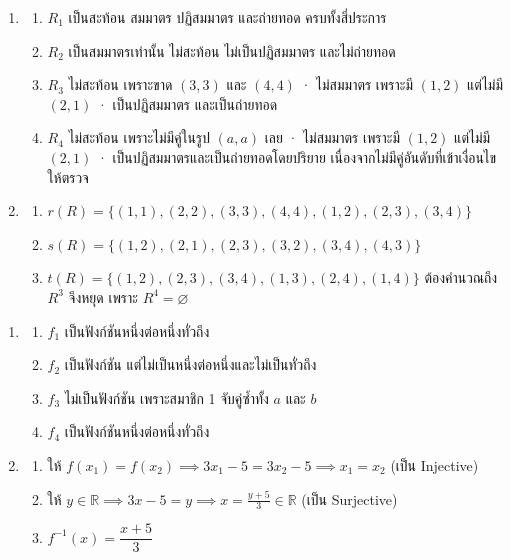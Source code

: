 \begin{enumerate}[resume*=anskey]
    \item
    \begin{enumerate}[label=\textbf{\thechapter.\arabic{enumi}.\arabic*}]
        \item $R_1$ เป็นสะท้อน สมมาตร ปฏิสมมาตร และถ่ายทอด ครบทั้งสี่ประการ
        \item $R_2$ เป็นสมมาตรเท่านั้น ไม่สะท้อน ไม่เป็นปฏิสมมาตร และไม่ถ่ายทอด
        \item $R_3$ ไม่สะท้อน เพราะขาด $(3,3)$ และ $(4,4)$ · ไม่สมมาตร เพราะมี $(1,2)$ แต่ไม่มี $(2,1)$ · เป็นปฏิสมมาตร และเป็นถ่ายทอด
        \item $R_4$ ไม่สะท้อน เพราะไม่มีคู่ในรูป $(a,a)$ เลย · ไม่สมมาตร เพราะมี $(1,2)$ แต่ไม่มี $(2,1)$ · เป็นปฏิสมมาตรและเป็นถ่ายทอดโดยปริยาย เนื่องจากไม่มีคู่อันดับที่เข้าเงื่อนไขให้ตรวจ
    \end{enumerate}

    \item
    \begin{enumerate}[label=\textbf{\thechapter.\arabic{enumi}.\arabic*}]
        \item $r(R) = \{(1,1),(2,2),(3,3),(4,4),(1,2),(2,3),(3,4)\}$
        \item $s(R) = \{(1,2),(2,1),(2,3),(3,2),(3,4),(4,3)\}$
        \item $t(R) = \{(1,2),(2,3),(3,4),(1,3),(2,4),(1,4)\}$ ต้องคำนวณถึง $R^3$ จึงหยุด เพราะ $R^4 = \varnothing$
    \end{enumerate}
\end{enumerate}

\begin{enumerate}[resume*=anskey]
    \item
    \begin{enumerate}[label=\textbf{\thechapter.\arabic{enumi}.\arabic*}]
        \item $f_1$ เป็นฟังก์ชันหนึ่งต่อหนึ่งทั่วถึง
        \item $f_2$ เป็นฟังก์ชัน แต่ไม่เป็นหนึ่งต่อหนึ่งและไม่เป็นทั่วถึง
        \item $f_3$ ไม่เป็นฟังก์ชัน เพราะสมาชิก 1 จับคู่ซ้ำทั้ง $a$ และ $b$
        \item $f_4$ เป็นฟังก์ชันหนึ่งต่อหนึ่งทั่วถึง
    \end{enumerate}

    \item
    \begin{enumerate}[label=\textbf{\thechapter.\arabic{enumi}.\arabic*}]
        \item ให้ $f(x_1) = f(x_2) \implies 3x_1 - 5 = 3x_2 - 5 \implies x_1 = x_2$ (เป็น Injective)
        \item ให้ $y \in \mathbb{R} \implies 3x - 5 = y \implies x = \frac{y+5}{3} \in \mathbb{R}$ (เป็น Surjective)
        \item $f^{-1}(x) = \dfrac{x+5}{3}$
    \end{enumerate}
\end{enumerate}

